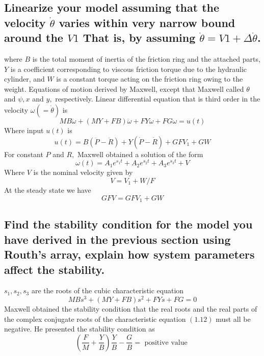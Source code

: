 \documentclass[11pt]{scrartcl} %
\begin{document}
\subsection{Linearize your model assuming that the velocity $\dot{\theta}$ varies within very narrow bound around the $V 1$ That is, by assuming $\dot{\theta}=V 1+\Delta \dot{\theta}$.}

where $B$ is the total moment of inertia of the friction ring and the attached parts, $Y$ is a coefficient corresponding to viscous friction torque due to the hydraulic cylinder, and $W$ is a constant torque acting on the friction ring owing to the weight. Equations of motion derived by Maxwell, except that Maxwell called $\theta$ and $\psi, x$ and $y,$ respectively. Linear differential equation that is third order in the velocity $\omega(=\dot{\theta})$ is 
\begin{equation}
M B \ddot{\omega}+(M Y+F B) \ddot{\omega}+F Y \dot{\omega}+F G \omega=u(t)
\end{equation}
Where input $u(t)$ is
\begin{equation}
u(t)=B(\ddot{P}-\ddot{R})+Y(\dot{P}-\dot{R})+G F V_{1}+G W
\end{equation}
For constant $P$ and $R,$ Maxwell obtained a solution of the form
\begin{equation}
\omega(t)=A_{1} e^{s_{1} t}+A_{2} e^{s_{2} t}+A_{3} e^{s_{3} t}+V
\end{equation}
Where $V$ is the nominal velocity given by
\begin{equation}
V=V_{1}+W / F
\end{equation}
At the steady state we have
\begin{equation}
G F V=G F V_{1}+G W
\end{equation}

\subsection{Find the stability condition for the model you have derived in the previous section using Routh's array, explain how system parameters affect the stability.}

$s_{1}, s_{2}, s_{3}$ are the roots of the cubic characteristic equation
\begin{equation}
M B s^{3}+(M Y+F B) s^{2}+F Y s+F G=0
\end{equation}
Maxwell obtained the stability condition that the real roots and the real parts of the complex conjugate roots of the characteristic equation $(1.12)$ must all be negative. He presented the stability condition as
\begin{equation}
\left(\frac{F}{M}+\frac{Y}{B}\right) \frac{Y}{B}-\frac{G}{B}=\text { positive value }
\end{equation}
\end{document}
